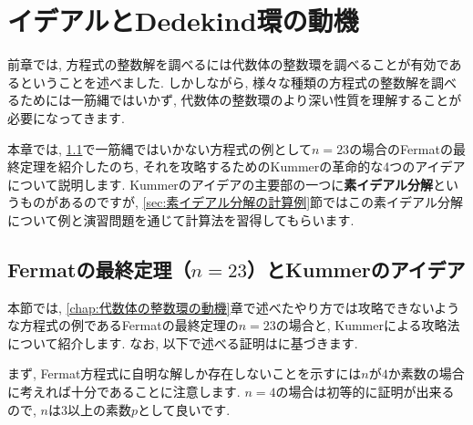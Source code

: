 \documentclass[11pt,b5paper,oneside,titlepage,lualatex]{ltjsreport}
\begin{document}
\clearpage


\chapter{イデアルとDedekind環の動機} \label{chap:イデアルとDedekind環の動機}


前章では, 方程式の整数解を調べるには代数体の整数環を調べることが有効であるということを述べました. 
しかしながら, 様々な種類の方程式の整数解を調べるためには一筋縄ではいかず, 代数体の整数環のより深い性質を理解することが必要になってきます. 

本章では, \ref{sec:Fermatの最終定理（n=23）}で一筋縄ではいかない方程式の例として$ n=23 $の場合のFermatの最終定理を紹介したのち, それを攻略するためのKummerの革命的な4つのアイデアについて説明します. 
Kummerのアイデアの主要部の一つに\textbf{素イデアル分解}というものがあるのですが, \ref{sec:素イデアル分解の計算例}節ではこの素イデアル分解について例と演習問題を通じて計算法を習得してもらいます. 


\section{Fermatの最終定理（$ n=23 $）とKummerのアイデア} \label{sec:Fermatの最終定理（n=23）}


本節では, \ref{chap:代数体の整数環の動機}章で述べたやり方では攻略できないような方程式の例であるFermatの最終定理の$ n=23 $の場合と, Kummerによる攻略法について紹介します. 
なお, 以下で述べる証明は\cite[定理 8.11.15]{Yukie1}に基づきます. 

まず, Fermat方程式に自明な解しか存在しないことを示すには$ n $が$ 4 $か素数の場合に考えれば十分であることに注意します. 
$ n=4 $の場合は初等的に証明が出来るので, $ n $は$ 3 $以上の素数$ p $として良いです. 
\end{document}
